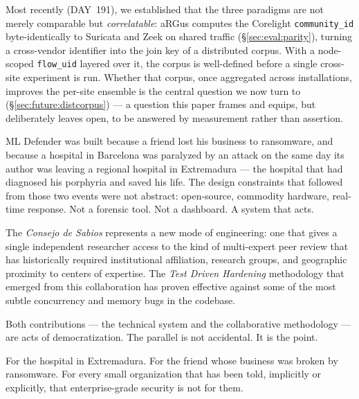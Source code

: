 \documentclass[11pt,a4paper]{article}
\begin{document}
    Most recently (DAY~191), we established that the three paradigms are not merely
    comparable but \emph{correlatable}: aRGus computes the Corelight \texttt{community\_id}
    byte-identically to Suricata and Zeek on shared traffic (\S\ref{sec:eval:parity}),
    turning a cross-vendor identifier into the join key of a distributed corpus. With a
    node-scoped \texttt{flow\_uid} layered over it, the corpus is well-defined before a
    single cross-site experiment is run. Whether that corpus, once aggregated across
    installations, improves the per-site ensemble is the central question we now turn to
    (\S\ref{sec:future:distcorpus}) --- a question this paper frames and equips, but
    deliberately leaves open, to be answered by measurement rather than assertion.

    ML Defender was built because a friend lost his business to ransomware, and because a
    hospital in Barcelona was paralyzed by an attack on the same day its author was leaving a
    regional hospital in Extremadura --- the hospital that had diagnosed his porphyria and saved
    his life. The design constraints that followed from those two events were not abstract:
    open-source, commodity hardware, real-time response. Not a forensic tool. Not a dashboard. A
    system that acts.

    The \emph{Consejo de Sabios} represents a new mode of engineering: one that gives a single
    independent researcher access to the kind of multi-expert peer review that has historically
    required institutional affiliation, research groups, and geographic proximity to centers of
    expertise. The \emph{Test Driven Hardening} methodology that emerged from this collaboration
    has proven effective against some of the most subtle concurrency and memory bugs in the
    codebase.

    Both contributions --- the technical system and the collaborative methodology --- are acts of
    democratization. The parallel is not accidental. It is the point.

    \medskip

    \noindent For the hospital in Extremadura. For the friend whose business was broken by
    ransomware. For every small organization that has been told, implicitly or explicitly, that
    enterprise-grade security is not for them.

    \medskip
\end{document}

